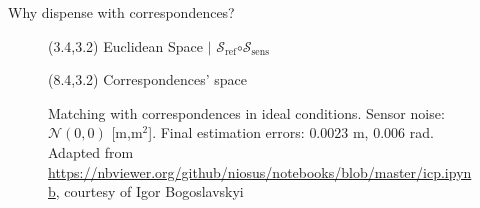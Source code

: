 \begin{frame}[noframenumbering]{Why dispense with correspondences?}


  \begin{figure}\vspace{1cm}
    \caption{Matching with correspondences in ideal conditions. Sensor noise:
             $\mathcal{N}(0,0)$ [m,m$^2$]. Final estimation errors: $0.0023$ m, $0.006$
             rad. Adapted from
             \url{https://nbviewer.org/github/niosus/notebooks/blob/master/icp.ipynb},
             courtesy of Igor Bogoslavskyi}
    \begin{textblock}{5}(3.4,3.2)
      \scriptsize Euclidean Space $|$ \textcolor{r}{$\mathcal{S}_{\text{ref}}$}$\circ$\textcolor{b}{$\mathcal{S}_{\text{sens}}$}
    \end{textblock}
    \begin{textblock}{4}(8.4,3.2)
      \scriptsize Correspondences' space
    \end{textblock}
  \end{figure}

\end{frame}
